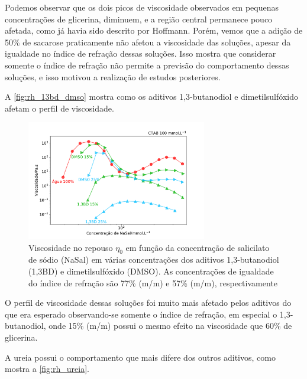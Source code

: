 			Podemos observar que os dois picos de viscosidade observados em pequenas concentrações de glicerina, diminuem, e a região central permanece pouco afetada, como já havia sido descrito por Hoffmann. Porém, vemos que a adição de 50\% de sacarose praticamente não afetou a viscosidade das soluções, apesar da igualdade no índice de refração dessas soluções. Isso mostra que considerar somente o índice de refração não permite a previsão do comportamento dessas soluções, e isso motivou a realização de estudos posteriores.
			
			A \autoref{fig:rh_13bd_dmso} mostra como os aditivos 1,3-butanodiol e dimetilsulfóxido afetam o perfil de viscosidade.
			
			\begin{figure}[h]
				\centering
				\includegraphics[width=0.7\textwidth]{imagens/reologia/RH_13BD_DMSO}
				\caption{Viscosidade no repouso \(\eta_0\) em função da concentração de salicilato de sódio (NaSal) em várias concentrações dos aditivos 1,3-butanodiol (1,3BD) e dimetilsulfóxido (DMSO). As concentrações de igualdade do índice de refração são 77\% (m/m) e 57\% (m/m), respectivamente}
				\label{fig:rh_13bd_dmso}
			\end{figure}
		
			O perfil de viscosidade dessas soluções foi muito mais afetado pelos aditivos do que era esperado observando-se somente o índice de refração, em especial o 1,3-butanodiol, onde 15\% (m/m) possui o mesmo efeito na viscosidade que 60\% de glicerina.
			
			A ureia possui o comportamento que mais difere dos outros aditivos, como mostra a \autoref{fig:rh_ureia}.
			
